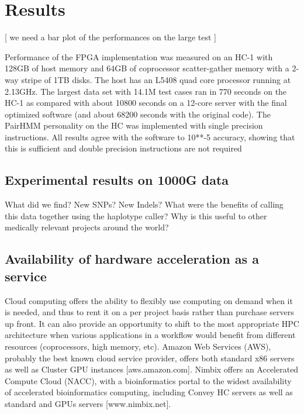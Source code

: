 \documentclass[11pt, oneside]{article}
\begin{document}
	\section{Results}


    [ we need a bar plot of the performances on the large test ]
	
	Performance of the FPGA implementation was measured on an HC-1 with 128GB of
	host memory and 64GB of coprocessor scatter-gather memory with a 2-way
	stripe of 1TB disks.  The host has an L5408 quad core processor running at
	2.13GHz.  The largest data set with 14.1M test cases ran in 770 seconds on
	the HC-1 as compared with about 10800 seconds on a 12-core server with the
	final optimized software (and about 68200 seconds with the original code).
	The PairHMM personality on the HC was implemented with single precision
	instructions.  All results agree with the software to 10**-5 accuracy,
	showing that this is sufficient and double precision instructions are not
	required

	\subsection{Experimental results on 1000G data} 
	
	What did we find? New SNPs? New Indels?  What were the benefits of calling
	this data together using the haplotype caller?  Why is this useful to other
	medically relevant projects around the world?  
	
	\subsection{Availability of hardware acceleration as a service} 

	Cloud computing offers the ability to flexibly use computing on demand when
	it is needed, and thus to rent it on a per project basis rather than
	purchase servers up front.  It can also provide an opportunity to shift to
	the most appropriate HPC architecture when various applications in a
	workflow would benefit from different resources (coprocessors, high memory,
	etc).  Amazon Web Services (AWS), probably the best known cloud
	service provider, offers both standard x86 servers as well as Cluster GPU
	instances [aws.amazon.com].  Nimbix offers an Accelerated Compute Cloud
	(NACC), with a bioinformatics portal to the widest availability of
	accelerated bioinformatics computing, including Convey HC servers as well as
	standard and GPUs servers [www.nimbix.net].
\end{document}
